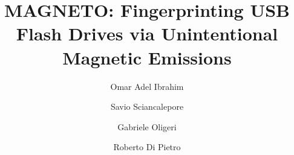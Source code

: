 \documentclass[acmsmall, authorversion]{acmart}
\newcommand{\sol}{\emph{MAGNETO}}
\begin{document}

\title{MAGNETO: Fingerprinting USB Flash Drives via Unintentional Magnetic Emissions}

\author{Omar Adel Ibrahim}

\author{Savio Sciancalepore}

\author{Gabriele Oligeri}

\author{Roberto Di Pietro}
\end{document}
